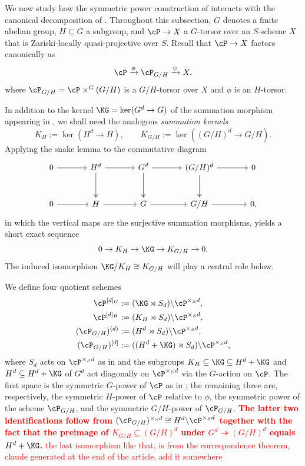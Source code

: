 We now study how the symmetric power construction of  interacts with the canonical decomposition of .
Throughout this subsection, $G$ denotes a finite abelian group, $H \subseteq G$ a subgroup, and $\cP \to X$ a $G$-torsor over an $S$-scheme $X$ that is Zariski-locally quasi-projective over $S$.
Recall that $\cP \to X$ factors canonically as
\[
\cP \xrightarrow{\phi} \cP_{G/H} \xrightarrow{\psi} X,
\]
where $\cP_{G/H} = \cP \times^G (G/H)$ is a $G/H$-torsor over $X$ and $\phi$ is an $H$-torsor.

In addition to the kernel $\KG = \ker(G^d \to G)$ of the summation morphism appearing in , we shall need the analogous \emph{summation kernels}
\[
K_H := \ker(H^d \to H), \qquad K_{G/H} := \ker((G/H)^d \to G/H).
\]
Applying the snake lemma to the commutative diagram
\[
\begin{tikzcd}[row sep=large, column sep=large]
0 \arrow[r] & H^d \arrow[r] \arrow[d, twoheadrightarrow] & G^d \arrow[r] \arrow[d, twoheadrightarrow] & (G/H)^d \arrow[r] \arrow[d, twoheadrightarrow] & 0 \\
0 \arrow[r] & H \arrow[r] & G \arrow[r] & G/H \arrow[r] & 0,
\end{tikzcd}
\]
in which the vertical maps are the surjective summation morphisms, yields a short exact sequence
\begin{equation}\label{eq:summation_kernels_ses}
0 \to K_H \to \KG \to K_{G/H} \to 0.
\end{equation}
The induced isomorphism $\KG/K_H \cong K_{G/H}$ will play a central role below.

We define four quotient schemes
\begin{align*}
    \cP^{[d]_G} &:= (\KG \rtimes S_d) \backslash \cP^{\times_S d}, \\
    \cP^{[d]_H} &:= (K_H \rtimes S_d) \backslash \cP^{\times_S d}, \\
    (\cP_{G/H})^{(d)} &:= (H^d \rtimes S_d) \backslash \cP^{\times_S d}, \\
    (\cP_{G/H})^{[d]} &:= ((H^d + \KG) \rtimes S_d) \backslash \cP^{\times_S d},
\end{align*}
where $S_d$ acts on $\cP^{\times_S d}$ as in  and the subgroups $K_H \subseteq \KG \subseteq H^d + \KG$ and $H^d \subseteq H^d + \KG$ of $G^d$ act diagonally on $\cP^{\times_S d}$ via the $G$-action on $\cP$. The first space is the symmetric $G$-power of $\cP$ as in ; the remaining three are, respectively, the symmetric $H$-power of $\cP$ relative to $\phi$, the symmetric power of the scheme $\cP_{G/H}$, and the symmetric $G/H$-power of $\cP_{G/H}$.
\textcolor{red}{\textbf{The latter two identifications follow from $(\cP_{G/H})^{\times_S d} \cong H^d \backslash \cP^{\times_S d}$ together with the fact that the preimage of $K_{G/H} \subseteq (G/H)^d$ under $G^d \twoheadrightarrow (G/H)^d$ equals $H^d + \KG$.}}
\textcolor{red}{the last isomorphism like that, is from the correspondence theorem, claude generated at the end of the article, add it somewhere}

